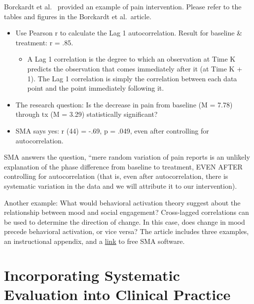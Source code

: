\documentclass[
  english,
]{book}
\providecommand{\tightlist}{%
  \setlength{\itemsep}{0pt}\setlength{\parskip}{0pt}}
\begin{document}
Borckardt et al.~\citeyearpar{borckardt_clinical_2008} provided an example of pain intervention. Please refer to the tables and figures in the Borckardt et al.~article.

\begin{itemize}
\tightlist
\item
  Use Pearson r to calculate the Lag 1 autocorrelation. Result for baseline \& treatment: r = .85.

  \begin{itemize}
  \tightlist
  \item
    A Lag 1 correlation is the degree to which an observation at Time K predicts the observation that comes immediately after it (at Time K + 1). The Lag 1 correlation is simply the correlation between each data point and the point immediately following it.
  \end{itemize}
\item
  The research question: Is the decrease in pain from baseline (M = 7.78) through tx (M = 3.29) statistically significant?
\item
  SMA says yes: r (44) = -.69, p = .049, even after controlling for autocorrelation.
\end{itemize}

SMA answers the question, ``mere random variation of pain reports is an unlikely explanation of the phase difference from baseline to treatment, EVEN AFTER controlling for autocorrelation (that is, even after autocorrelation, there is systematic variation in the data and we will attribute it to our intervention).

Another example: What would behavioral activation theory suggest about the relationship between mood and social engagement? Cross-lagged correlations can be used to determine the direction of change. In this case, does change in mood precede behavioral activation, or vice versa? The article includes three examples, an instructional appendix, and a \href{http://clinicalresearcher.org}{link} to free SMA software.

\hypertarget{incorporating-systematic-evaluation-into-clinical-practice}{%
\section{Incorporating Systematic Evaluation into Clinical Practice}\label{incorporating-systematic-evaluation-into-clinical-practice}}
\end{document}
